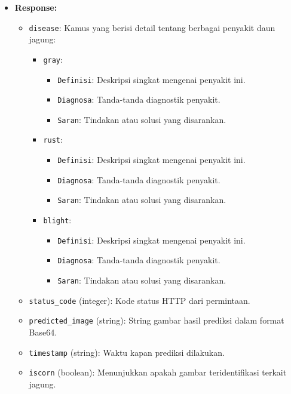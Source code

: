 \documentclass[journal,article,submit,pdftex,moreauthors]{Definitions/mdpi}
\begin{document}
\begin{itemize}
\begin{itemize}[left=0pt, label={}]
        \item \textbf{Response:}
        \begin{itemize}
            \item \texttt{disease}: Kamus yang berisi detail tentang berbagai penyakit daun jagung:
            \begin{itemize}
                \item \texttt{gray}:
                \begin{itemize}
                    \item \texttt{Definisi}: Deskripsi singkat mengenai penyakit ini.
                    \item \texttt{Diagnosa}: Tanda-tanda diagnostik penyakit.
                    \item \texttt{Saran}: Tindakan atau solusi yang disarankan.
                \end{itemize}
                \item \texttt{rust}:
                \begin{itemize}
                    \item \texttt{Definisi}: Deskripsi singkat mengenai penyakit ini.
                    \item \texttt{Diagnosa}: Tanda-tanda diagnostik penyakit.
                    \item \texttt{Saran}: Tindakan atau solusi yang disarankan.
                \end{itemize}
                \item \texttt{blight}:
                \begin{itemize}
                    \item \texttt{Definisi}: Deskripsi singkat mengenai penyakit ini.
                    \item \texttt{Diagnosa}: Tanda-tanda diagnostik penyakit.
                    \item \texttt{Saran}: Tindakan atau solusi yang disarankan.
                \end{itemize}
            \end{itemize}
            \item \texttt{status\_code} (integer): Kode status HTTP dari permintaan.
            \item \texttt{predicted\_image} (string): String gambar hasil prediksi dalam format Base64.
            \item \texttt{timestamp} (string): Waktu kapan prediksi dilakukan.
            \item \texttt{iscorn} (boolean): Menunjukkan apakah gambar teridentifikasi terkait jagung.

\end{itemize}
\end{itemize}
\end{itemize}
\end{document}
